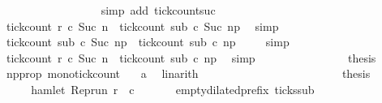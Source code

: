 \begin{isabellebody}
\ \ \ \ \ \ \ \ \ \ \ \ \ \ \ \ \isamarkupfalse%
\ {\isacharparenleft}simp\ add{\isacharcolon}\ tick{\isacharunderscore}count{\isacharunderscore}suc{\isacharparenright}\isanewline
\ \ \ \ \ \ \ \ \ \ \ \ \ \ \isamarkupfalse%
\ \isamarkupfalse%
\ {\isacartoucheopen}tick{\isacharunderscore}count\ r\ c\ {\isacharparenleft}Suc\ n{\isacharparenright}\ {\isasymle}\ tick{\isacharunderscore}count\ sub\ c\ {\isacharparenleft}Suc\ n\isactrlsub p{\isacharparenright}{\isacartoucheclose}\ \isamarkupfalse%
\ simp\isanewline
\ \ \ \ \ \ \ \ \ \ \ \ \ \ \isamarkupfalse%
\ \isamarkupfalse%
\ {\isacartoucheopen}tick{\isacharunderscore}count\ sub\ c\ {\isacharparenleft}Suc\ n\isactrlsub p{\isacharparenright}\ {\isasymle}\ tick{\isacharunderscore}count\ sub\ c\ n\isactrlsub p{\isacartoucheclose}\ \isamarkupfalse%
\ {}\ \isamarkupfalse%
\ simp\isanewline
\ \ \ \ \ \ \ \ \ \ \ \ \ \ \isamarkupfalse%
\ \isamarkupfalse%
\ {\isacartoucheopen}tick{\isacharunderscore}count\ r\ c\ {\isacharparenleft}Suc\ n{\isacharparenright}\ {\isasymle}\ tick{\isacharunderscore}count\ sub\ c\ n\isactrlsub p{\isacartoucheclose}\ \isamarkupfalse%
\ simp\isanewline
\ \ \ \ \ \ \ \ \ \ \ \ \ \ \isamarkupfalse%
\ {\isacharquery}thesis\ \isamarkupfalse%
\ np{\isacharunderscore}prop\ mono{\isacharunderscore}tick{\isacharunderscore}count\ \ \isamarkupfalse%
\ a\ \isamarkupfalse%
\ linarith\isanewline
\ \ \ \ \ \ \ \ \ \ \isamarkupfalse%
\isanewline
\ \ \ \ \ \ \isamarkupfalse%
\isanewline
\ \ \ \ \isacommand{{\isacharbraceright}}\isamarkupfalse%
\ \isamarkupfalse%
\ {\isacharquery}thesis\ \isacommand{{\isachardot}{\isachardot}}\isamarkupfalse%
\isanewline
\ \ \isamarkupfalse%
\isanewline
\ \ \isamarkupfalse%
\ \isamarkupfalse%
\ {}\ \isamarkupfalse%
\ {\isacartoucheopen}{\isasymnot}hamlet\ {\isacharparenleft}{\isacharparenleft}Rep{\isacharunderscore}run\ r{\isacharparenright}\ {}\ c\isanewline
\ \ \ \ \isamarkupfalse%
\ {\isacharasterisk}\ empty{\isacharunderscore}dilated{\isacharunderscore}prefix\ ticks{\isacharunderscore}sub\ \isamarkupfalse%

\end{isabellebody}
